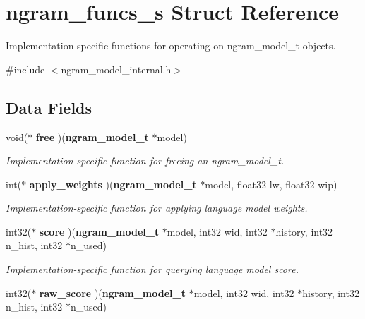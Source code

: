 \section{ngram\+\_\+funcs\+\_\+s Struct Reference}
\label{structngram__funcs__s}


Implementation-\/specific functions for operating on ngram\+\_\+model\+\_\+t objects.  




{\ttfamily \#include $<$ngram\+\_\+model\+\_\+internal.\+h$>$}

\subsection*{Data Fields}
\begin{DoxyCompactItemize}
\item 
void($\ast$ {\bf free} )({\bf ngram\+\_\+model\+\_\+t} $\ast$model)\label{structngram__funcs__s_ae13797f51aee31ddde0f150c1bbe1570}

\begin{DoxyCompactList}\small\item\em Implementation-\/specific function for freeing an ngram\+\_\+model\+\_\+t. \end{DoxyCompactList}\item 
int($\ast$ {\bf apply\+\_\+weights} )({\bf ngram\+\_\+model\+\_\+t} $\ast$model, float32 lw, float32 wip)\label{structngram__funcs__s_ae3cc072e20e6c1556c91b783ec061a4a}

\begin{DoxyCompactList}\small\item\em Implementation-\/specific function for applying language model weights. \end{DoxyCompactList}\item 
int32($\ast$ {\bf score} )({\bf ngram\+\_\+model\+\_\+t} $\ast$model, int32 wid, int32 $\ast$history, int32 n\+\_\+hist, int32 $\ast$n\+\_\+used)\label{structngram__funcs__s_ab74c094f1e88465559fdd29859bf4395}

\begin{DoxyCompactList}\small\item\em Implementation-\/specific function for querying language model score. \end{DoxyCompactList}\item 
int32($\ast$ {\bf raw\+\_\+score} )({\bf ngram\+\_\+model\+\_\+t} $\ast$model, int32 wid, int32 $\ast$history, int32 n\+\_\+hist, int32 $\ast$n\+\_\+used)\label{structngram__funcs__s_a9c9f83dc5151495a21b7eff16ad747d3}


\end{DoxyCompactItemize}
